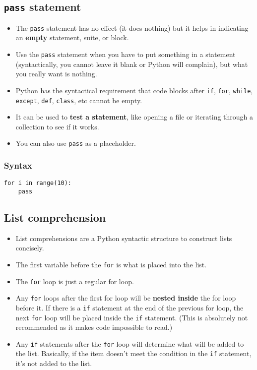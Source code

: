 \documentclass[11pt]{article}
\begin{document}
\subsection{\texttt{pass} statement}
\label{sec:org4373235}
\begin{itemize}
\item The \texttt{pass} statement has no effect (it does nothing) but it helps in indicating an \textbf{empty} statement, suite, or block.
\item Use the \texttt{pass} statement when you have to put something in a statement (syntactically, you cannot leave it blank or Python will complain), but what you really want is nothing.
\item Python has the syntactical requirement that code blocks after \texttt{if}, \texttt{for}, \texttt{while}, \texttt{except}, \texttt{def}, \texttt{class}, etc cannot be empty.
\item It can be used to \textbf{test a statement}, like opening a file or iterating through a collection to see if it works.
\item You can also use \texttt{pass} as a placeholder.
\end{itemize}

\subsubsection{Syntax}
\label{sec:org456f011}
\begin{verbatim}
for i in range(10):
    pass
\end{verbatim}

 \newpage

\subsection{List comprehension}
\label{sec:orgf66ed04}
\begin{itemize}
\item List comprehensions are a Python syntactic structure to construct lists concisely.
\item The first variable before the \texttt{for} is what is placed into the list.
\item The \texttt{for} loop is just a regular for loop.
\item Any \texttt{for} loops after the first for loop will be \textbf{nested inside} the for loop before it. If there is a \texttt{if} statement at the end of the previous for loop, the next \texttt{for} loop will be placed inside the \texttt{if} statement. (This is absolutely not recommended as it makes code impossible to read.)
\item Any \texttt{if} statements after the \texttt{for} loop will determine what will be added to the list. Basically, if the item doesn't meet the condition in the \texttt{if} statement, it's not added to the list.
\end{itemize}
\end{document}

